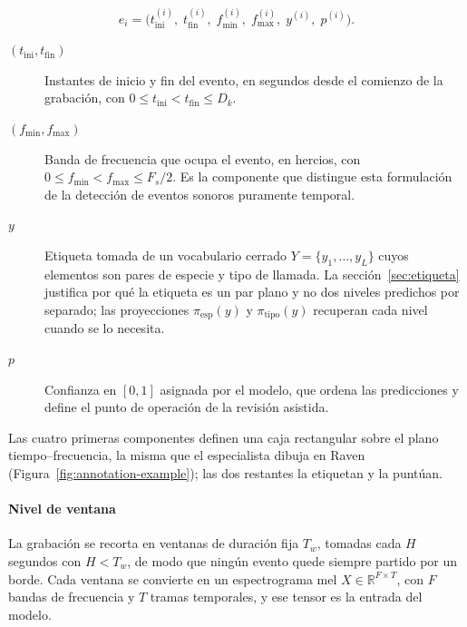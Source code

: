 \begin{equation}
    e_i = \bigl(t^{(i)}_{\text{ini}},\; t^{(i)}_{\text{fin}},\;
    f^{(i)}_{\min},\; f^{(i)}_{\max},\;
    y^{(i)},\; p^{(i)}\bigr).
    \label{eq:tupla}
\end{equation}

\begin{description}
    \item[$(t_{\text{ini}}, t_{\text{fin}})$] Instantes de inicio y fin del
          evento, en segundos desde el comienzo de la grabación, con
          $0 \le t_{\text{ini}} < t_{\text{fin}} \le D_k$.

    \item[$(f_{\min}, f_{\max})$] Banda de frecuencia que ocupa el evento, en
          hercios, con $0 \le f_{\min} < f_{\max} \le F_s/2$. Es la componente que
          distingue esta formulación de la detección de eventos sonoros puramente
          temporal.

    \item[$y$] Etiqueta tomada de un vocabulario cerrado
          $Y=\{y_1,\dots,y_L\}$ cuyos elementos son pares de especie y tipo de
          llamada. La sección~\ref{sec:etiqueta} justifica por qué la etiqueta es un
          par plano y no dos niveles predichos por separado; las proyecciones
          $\pi_{\text{esp}}(y)$ y $\pi_{\text{tipo}}(y)$ recuperan cada nivel cuando
          se lo necesita.

    \item[$p$] Confianza en $[0, 1]$ asignada por el modelo, que ordena las
          predicciones y define el punto de operación de la revisión asistida.
\end{description}

Las cuatro primeras componentes definen una caja rectangular sobre el plano
tiempo--frecuencia, la misma que el especialista dibuja en Raven
(Figura~\ref{fig:annotation-example}); las dos restantes la etiquetan y la
puntúan.

\paragraph{Nivel de ventana}
La grabación se recorta en ventanas de duración fija $T_w$, tomadas cada $H$
segundos con $H < T_w$, de modo que ningún evento quede siempre partido por un
borde. Cada ventana se convierte en un espectrograma mel
$X \in \mathbb{R}^{F \times T}$, con $F$ bandas de frecuencia y $T$ tramas
temporales, y ese tensor es la entrada del modelo.

